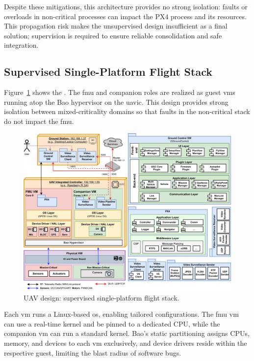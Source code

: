 Despite these mitigations, this architecture provides no strong isolation: faults
or overloads in non-critical processes can impact the PX4 process and its
resources. This propagation risk makes the unsupervised design insufficient as a
final solution; supervision is required to ensure reliable consolidation and
safe integration.

\subsection{Supervised Single-Platform Flight Stack}
\label{sec:superv-stack}

Figure~\ref{fig:uav-design-sup} shows the . The \gls{fmu} and
companion roles are realized as guest \glspl{vm} running atop the Bao
hypervisor on the \gls{uavic}. This design provides strong isolation between
mixed-criticality domains so that faults in the non-critical stack do not impact
the \gls{fmu}.

\begin{figure}[!hbt]
  \centering
  \includegraphics[width=1.0\textwidth]{./img/pdf/uav-main-design-sup.pdf}
  \caption{UAV design: supervised single-platform flight stack.}
  \label{fig:uav-design-sup}
\end{figure}

Each \gls{vm} runs a Linux-based \gls{os}, enabling tailored configurations. The
\gls{fmu} \gls{vm} can use a real-time kernel and be pinned to a dedicated CPU,
while the companion \gls{vm} can run a standard kernel. Bao’s static
partitioning assigns CPUs, memory, and devices to each \gls{vm} exclusively,
and device drivers reside within the respective guest, limiting the blast radius
of software bugs.

